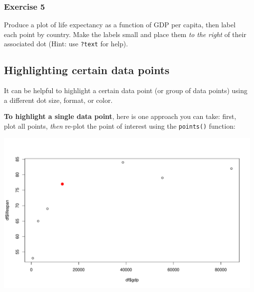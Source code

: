 \documentclass[
]{book}
\newenvironment{Shaded}{\begin{snugshade}}{\end{snugshade}}
\newcommand{\DataTypeTok}[1]{\textcolor[rgb]{0.13,0.29,0.53}{#1}}
\newcommand{\DecValTok}[1]{\textcolor[rgb]{0.00,0.00,0.81}{#1}}
\newcommand{\FloatTok}[1]{\textcolor[rgb]{0.00,0.00,0.81}{#1}}
\newcommand{\KeywordTok}[1]{\textcolor[rgb]{0.13,0.29,0.53}{\textbf{#1}}}
\newcommand{\NormalTok}[1]{#1}
\newcommand{\OperatorTok}[1]{\textcolor[rgb]{0.81,0.36,0.00}{\textbf{#1}}}
\newcommand{\StringTok}[1]{\textcolor[rgb]{0.31,0.60,0.02}{#1}}
\begin{document}
\hypertarget{exercise-5-1}{%
\subsubsection*{Exercise 5}\label{exercise-5-1}}

Produce a plot of life expectancy as a function of GDP per capita, then label each point by country. Make the labels small and place them \emph{to the right} of their associated dot (Hint: use \texttt{?text} for help).

\hypertarget{highlighting-certain-data-points}{%
\subsection*{Highlighting certain data points}\label{highlighting-certain-data-points}}

It can be helpful to highlight a certain data point (or group of data points) using a different dot size, format, or color.

\textbf{To highlight a single data point}, here is one approach you can take: first, plot all points, \emph{then} re-plot the point of interest using the \texttt{points()} function:

\begin{Shaded}
\end{Shaded}

\includegraphics{figures/unnamed-chunk-123-1.pdf}
\end{document}
